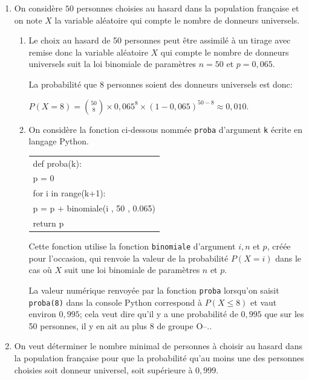 \begin{enumerate}
\item On considère $50$ personnes choisies au hasard dans la population française et on note $X$ la variable aléatoire qui compte le nombre de donneurs universels.
	\begin{enumerate}
		\item 
Le choix au hasard de 50 personnes peut être assimilé à un tirage avec remise donc la variable aléatoire $X$ qui compte le nombre de donneurs universels suit la loi binomiale de paramètres $n=50$ et $p=0,065$.

La probabilité que 8 personnes soient des donneurs universels est donc:

$P\left( X=8\right ) = \displaystyle\binom{50}{8}\times 0,065^{8}\times \left (1-0,065\right )^{50-8} \approx 0,010$.

		\item On considère la fonction ci-dessous nommée \texttt{proba} d'argument \texttt{k} écrite en langage Python.
		
\begin{center}
\ttfamily
\begin{tabular}{|l|}
\hline
def proba(k):\\
\quad p = 0\\
\quad for i in range(k+1):\\
\quad \quad p = p + binomiale(i , 50 , 0.065)\\ 
\quad return p\\ 
\hline
\end{tabular}
\end{center}

Cette fonction utilise la fonction \texttt{binomiale} d'argument $i, n$ et $p$, créée pour l'occasion, qui renvoie la valeur de la probabilité $P(X = i)$ dans le cas où $X$ suit une loi binomiale de paramètres $n$ et $p$.



La valeur numérique renvoyée par la fonction \texttt{proba} lorsqu'on saisit \texttt{proba(8)} dans la console Python correspond à $P\left ( X\leqslant 8 \right )$ et vaut environ $0,995$; cela veut dire qu'il y a une probabilité de $0,995$ que sur les 50 personnes, il y en ait au plus 8 de groupe O--..
	\end{enumerate}
	
\item On veut déterminer le nombre minimal de personnes à choisir au hasard dans la population française pour que la probabilité qu'au moins une des personnes choisies soit donneur universel, soit supérieure à $0,999$.


\end{enumerate}
